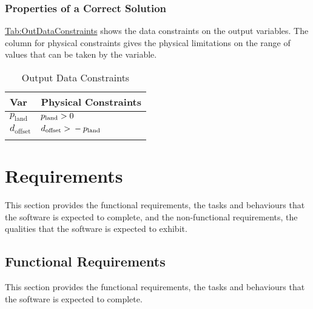 \documentclass[12pt]{article}
\newcommand{\gt}{\ensuremath >}
\begin{document}
\subsubsection{Properties of a Correct Solution}
\label{Sec:CorSolProps}
\hyperref[Table:OutDataConstraints]{Tab:OutDataConstraints} shows the data constraints on the output variables. The column for physical constraints gives the physical limitations on the range of values that can be taken by the variable.

\begin{longtable}{l l}
\toprule
\textbf{Var} & \textbf{Physical Constraints}
\\
\midrule
\endhead
${p_{\text{land}}}$ & ${p_{\text{land}}}\gt{}0$
\\
${d_{\text{offset}}}$ & ${d_{\text{offset}}}\gt{}-{p_{\text{land}}}$
\\
\bottomrule
\caption{Output Data Constraints}
\label{Table:OutDataConstraints}
\end{longtable}
\section{Requirements}
\label{Sec:Requirements}
This section provides the functional requirements, the tasks and behaviours that the software is expected to complete, and the non-functional requirements, the qualities that the software is expected to exhibit.

\subsection{Functional Requirements}
\label{Sec:FRs}
This section provides the functional requirements, the tasks and behaviours that the software is expected to complete.
\end{document}
